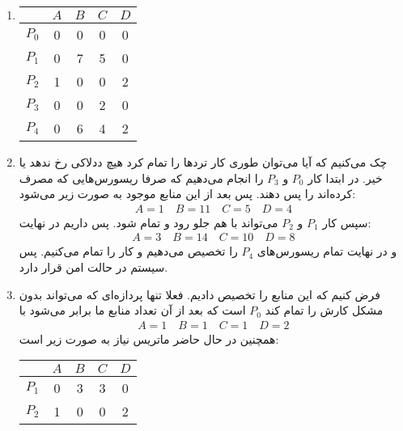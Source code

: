 \begin{enumerate}
    \item \phantom{جالب}
    \begin{center}
    \begin{latin}
    \begin{tabular}{c|c|c|c|c}
         & $A$ & $B$ & $C$ & $D$ \\
        \hline
        $P_0$ & 0 & 0 & 0 & 0 \\
        $P_1$ & 0 & 7 & 5 & 0 \\
        $P_2$ & 1 & 0 & 0 & 2 \\
        $P_3$ & 0 & 0 & 2 & 0 \\
        $P_4$ & 0 & 6 & 4 & 2
    \end{tabular}
    \end{latin}
    \end{center}
    \item چک می‌کنیم که آیا می‌توان طوری کار ترد‌ها را تمام کرد هیچ ددلاکی رخ ندهد یا خیر.
    در ابتدا کار
    $P_0$
    و
    $P_3$
    را انجام می‌دهیم که صرفا ریسورس‌هایی که مصرف کرده‌اند را پس دهند.
    پس بعد از این منابع موجود به صورت زیر می‌شود:
    \begin{gather*}
        A = 1 \quad B = 11 \quad C = 5 \quad D = 4
    \end{gather*}
    سپس کار
    $P_1$
    و
    $P_2$
    می‌تواند با هم جلو رود و تمام شود. پس داریم در نهایت:
    \begin{gather*}
        A = 3 \quad B = 14 \quad C = 10 \quad D = 8
    \end{gather*}
    و در نهایت تمام ریسورس‌های
    $P_4$
    را تخصیص می‌دهیم و کار را تمام می‌کنیم. پس سیستم در حالت امن قرار دارد.
    \item فرض کنیم که این منابع را تخصیص دادیم.
    فعلا تنها پردازه‌ای که می‌تواند بدون مشکل کارش را تمام کند
    $P_0$
    است که بعد از آن تعداد منابع ما برابر می‌شود با
    \begin{gather*}
        A = 1 \quad B = 1 \quad C = 1 \quad D = 2
    \end{gather*}
    همچنین در حال حاضر ماتریس نیاز به صورت زیر است:
    \begin{center}
        \begin{latin}
        \begin{tabular}{c|c|c|c|c}
             & $A$ & $B$ & $C$ & $D$ \\
            \hline
            $P_1$ & 0 & 3 & 3 & 0 \\
            $P_2$ & 1 & 0 & 0 & 2 \\

\end{tabular}
\end{latin}
\end{center}
\end{enumerate}

